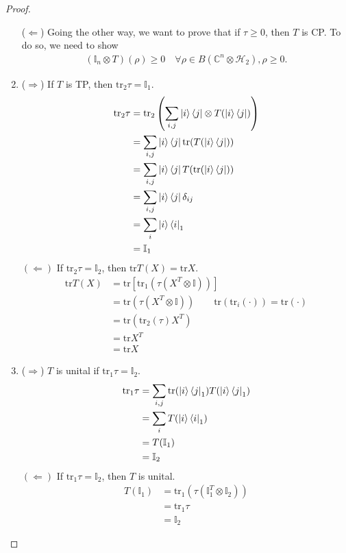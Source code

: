 \documentclass[10pt,oneside,longbibliography]{report}
\begin{document}
\begin{tcolorbox}[colframe=black,breakable, colback=black!5, arc=0pt, outer arc=0pt,boxrule=0.5pt]
\begin{proof}
\begin{enumerate}
    ($\Leftarrow$) Going the other way, we want to prove that if $\tau \geq 0$, then $T$ is CP. To do so, we need to show 
    \begin{align}
     (\mathbb{I}_n\otimes T)(\rho) \geq 0 \quad \forall \rho \in B(\mathbb{C}^n \otimes \mathcal{H}_2), \rho \geq 0.
    \end{align}
    
    \item ($\Rightarrow$) If $T$ is TP, then $\text{tr}_2 \tau = \mathbb{I}_1$.
    \begin{align}
        \text{tr}_2 \tau &= \text{tr}_2\left(\sum_{i,j} \ket{i}\bra{j} \otimes T(\ket{i}\bra{j})\right)\\
        &= \sum_{i,j} \ket{i}\bra{j}  \text{tr}(T(\ket{i}\bra{j}))\\
        &=\sum_{i,j} \ket{i}\bra{j} T(\text{tr}(\ket{i}\bra{j}))\\
        &=\sum_{i,j} \ket{i}\bra{j} \delta_{ij}\\
        &=\sum_i \ket{i}\bra{i}_1 \\
        &= \mathbb{I}_1
    \end{align}
    $(\Leftarrow)$ If $\text{tr}_2 \tau = \mathbb{I}_2$, then $\text{tr}T(X)=\text{tr}X$.
    \begin{align}
        \text{tr}T(X) &= \text{tr}\left[\text{tr}_1 (\tau(X^{T}\otimes \mathbb{I}))\right]\\
        &=\text{tr}(\tau(X^T \otimes \mathbb{I})) \quad \quad \text{tr}(\text{tr}_i(\cdot))=\text{tr}(\cdot)\\
        &= \text{tr}\left(\text{tr}_2 (\tau) X^{T} \right)\\
        &=\text{tr}X^{T} \\
        &=\text{tr}X
    \end{align}
    \item ($\Rightarrow$) $T$ is unital if $\text{tr}_1 \tau =\mathbb{I}_2$.
    \begin{align}
       \text{tr}_1 \tau &= \sum_{i,j} \text{tr}(\ket{i}\bra{j}_1)T(\ket{i}\bra{j}_1) \\
        &= \sum_i T(\ket{i}\bra{i}_1)\\
        &= T(\mathbb{I}_1)\\
        &= \mathbb{I}_2
    \end{align}
    $(\Leftarrow)$ If $\text{tr}_1 \tau =\mathbb{I}_2$, then $T$ is unital.
    \begin{align}
     T(\mathbb{I}_1)&=\text{tr}_1\left(\tau(\mathbb{I}_1^T \otimes \mathbb{I}_2)\right)\\
     &= \text{tr}_1 \tau \\
     &= \mathbb{I}_2
    \end{align}
\end{enumerate}
\end{proof}
\end{tcolorbox}
\end{document}

